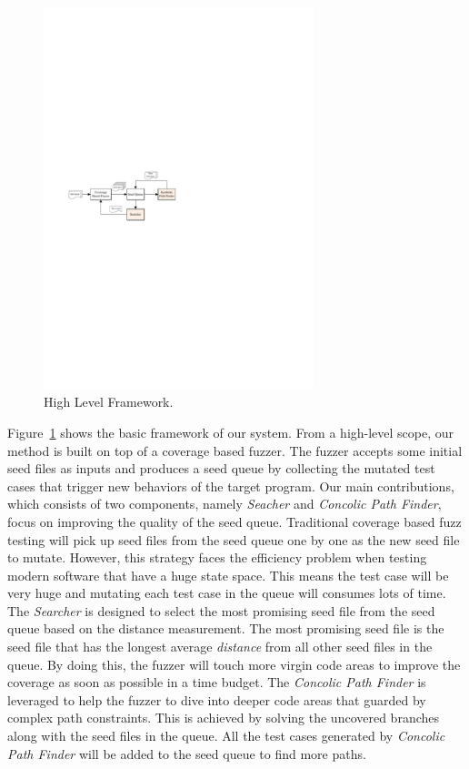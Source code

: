 \begin{figure}
\centering
\includegraphics[width=0.7\textwidth]{figures/framework.pdf} 
\caption{High Level Framework.}\label{Framework}
\end{figure}

Figure~\ref{Framework} shows the basic framework of our system. From a high-level scope, our method is built on top of a coverage based fuzzer. The fuzzer accepts some initial seed files as inputs and produces a seed queue by collecting the mutated test cases that trigger new behaviors of the target program. Our main contributions, which consists of two components, namely \emph{Seacher} and \emph{Concolic Path Finder}, focus on improving the quality of the seed queue. Traditional coverage based fuzz testing will pick up seed files from the seed queue one by one as the new seed file to mutate. However, this strategy faces the efficiency problem when testing modern software that have a huge state space. This means the test case will be very huge and mutating each test case in the queue will consumes lots of time. The \emph{Searcher} is designed to select the most promising seed file from the seed queue based on the distance measurement. The most promising seed file is the seed file that has the longest average \textit{distance} from all other seed files in the queue. By doing this, the fuzzer will touch more virgin code areas to improve the coverage as soon as possible in a time budget. The \emph{Concolic Path Finder} is leveraged to help the fuzzer to dive into deeper code areas that guarded by complex path constraints. This is achieved by solving the uncovered branches along with the seed files in the queue. All the test cases generated by \emph{Concolic Path Finder} will be added to the seed queue to find more paths.
